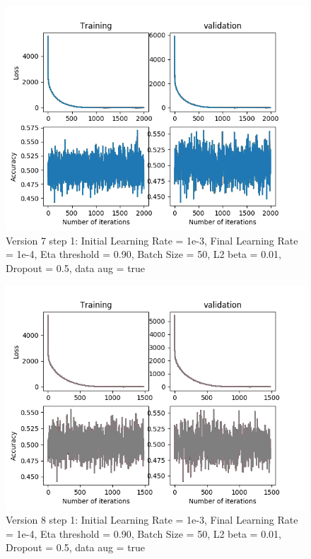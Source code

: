 \documentclass[12pt,reqno]{amsart}
\numberwithin{equation}{section}
\begin{document}
\begin{enumerate}
\begin{figure}[H]
\centering
\includegraphics[scale=0.6]{data_liquid10_version7_step1}
\caption{Version 7 step 1: Initial Learning Rate = 1e-3, Final Learning Rate = 1e-4, Eta threshold = 0.90, Batch Size = 50, L2 beta = 0.01, Dropout = 0.5, data aug = true}
\end{figure}

\begin{figure}[H]
\centering
\includegraphics[scale=0.6]{data_liquid10_version8_step1}
\caption{Version 8 step 1: Initial Learning Rate = 1e-3, Final Learning Rate = 1e-4, Eta threshold = 0.90, Batch Size = 50, L2 beta = 0.01, Dropout = 0.5, data aug = true}
\end{figure}


\end{enumerate}
\end{document}

